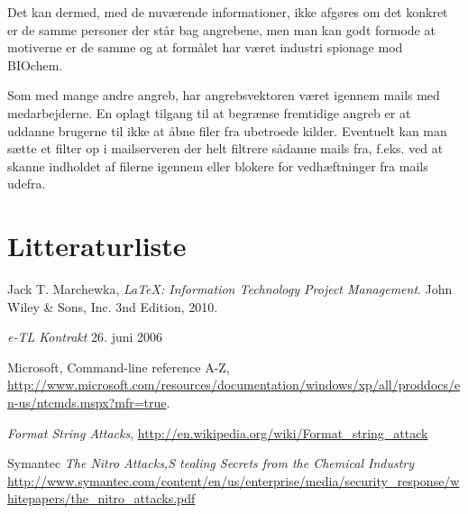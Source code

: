 \documentclass[10pt,a4paper,danish]{article}
\begin{document}
Det kan dermed, med de nuværende informationer, ikke afgøres om det konkret er
de samme personer der står bag angrebene, men man kan godt formode at motiverne
er de samme og at formålet har været industri spionage mod BIOchem.


Som med mange andre angreb, har angrebsvektoren været igennem mails med
medarbejderne.
En oplagt tilgang til at begrænse fremtidige angreb er at uddanne brugerne til
ikke at åbne filer fra ubetroede kilder.
Eventuelt kan man sætte et filter op i mailserveren der helt filtrere sådanne
mails fra, f.eks. ved at skanne indholdet af filerne igennem eller blokere for
vedhæftninger fra mails udefra.



\section{Litteraturliste}

\begin{thebibliography}{9}
 Jack T. Marchewka, \textit{\LaTeX: Information Technology
    Project Management}.  John Wiley \& Sons, Inc.  3nd Edition, 2010.

 \textit{e-TL Kontrakt} 26. juni 2006

 Microsoft, Command-line reference A-Z,
  \url{http://www.microsoft.com/resources/documentation/windows/xp/all/proddocs/en-us/ntcmds.mspx?mfr=true}.

 \textit{Format String Attacks},
  \url{http://en.wikipedia.org/wiki/Format_string_attack}

 Symantec \textit{The Nitro Attacks,S
tealing Secrets from the Chemical Industry} \url{http://www.symantec.com/content/en/us/enterprise/media/security_response/whitepapers/the_nitro_attacks.pdf}

\end{thebibliography}
\end{document}

